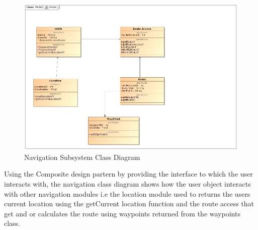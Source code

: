 \documentclass{article}
\begin{document}
				\begin{figure}[H]
					\includegraphics[scale=0.5]{Diagrams/Class_Diagram_Navigation.JPG}
					\caption{Navigation Subsystem Class Diagram}	
				\end{figure}
				{Using the Composite design partern by providing the interface to which the user interacts with, the navigation class diagram shows how the user object interacts with other navigation  modules i.e the location module used to returns the users current location using the getCurrent location function and the route access that get and or calculates the route using waypoints returned from the waypoints class.\\\\}
			
\end{document}
